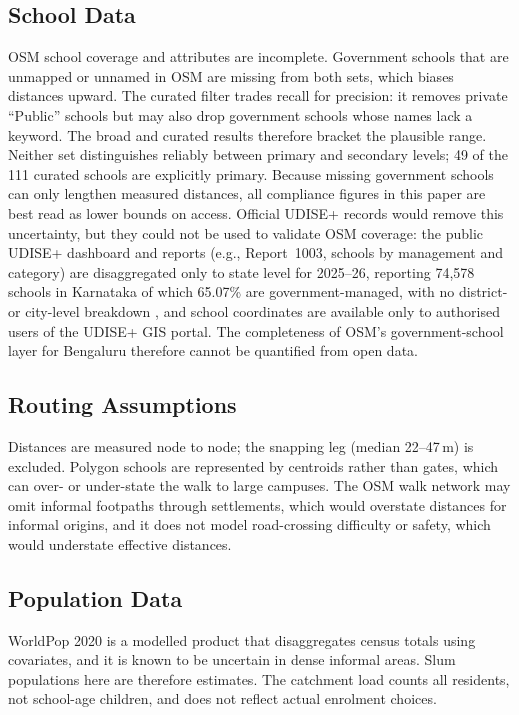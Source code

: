 \documentclass[conference]{IEEEtran}
\newcommand{\m}{\,m}
\begin{document}
\subsection{School Data}
OSM school coverage and attributes are incomplete. Government schools that are unmapped or unnamed in OSM are missing from both sets, which biases distances upward. The curated filter trades recall for precision: it removes private ``Public'' schools but may also drop government schools whose names lack a keyword. The broad and curated results therefore bracket the plausible range. Neither set distinguishes reliably between primary and secondary levels; 49 of the 111 curated schools are explicitly primary. Because missing government schools can only lengthen measured distances, all compliance figures in this paper are best read as lower bounds on access. Official UDISE+ records would remove this uncertainty, but they could not be used to validate OSM coverage: the public UDISE+ dashboard and reports (e.g., Report~1003, schools by management and category) are disaggregated only to state level for 2025--26, reporting 74,578 schools in Karnataka of which 65.07\% are government-managed, with no district- or city-level breakdown \cite{udise2026}, and school coordinates are available only to authorised users of the UDISE+ GIS portal. The completeness of OSM's government-school layer for Bengaluru therefore cannot be quantified from open data.

\subsection{Routing Assumptions}
Distances are measured node to node; the snapping leg (median 22--47\m{}) is excluded. Polygon schools are represented by centroids rather than gates, which can over- or under-state the walk to large campuses. The OSM walk network may omit informal footpaths through settlements, which would overstate distances for informal origins, and it does not model road-crossing difficulty or safety, which would understate effective distances.

\subsection{Population Data}
WorldPop 2020 is a modelled product that disaggregates census totals using covariates, and it is known to be uncertain in dense informal areas. Slum populations here are therefore estimates. The catchment load counts all residents, not school-age children, and does not reflect actual enrolment choices.
\end{document}
